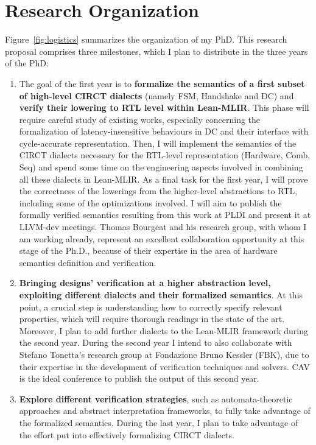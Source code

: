 \documentclass[sigconf,authorversion,nonacm, 11pt]{acmart}
\begin{document}
\section{Research Organization}

Figure~\ref{fig:logistics} summarizes the organization of my PhD.
This research proposal comprises three milestones, which I plan to distribute in the three years of the PhD: 
\begin{enumerate}
    \item The goal of the first year is to \textbf{formalize the semantics of a first subset of high-level CIRCT dialects} (namely FSM, Handshake and DC) 
 and \textbf{verify their lowering to RTL level within Lean-MLIR}.
 This phase will require careful study of existing works, especially concerning the formalization of latency-insensitive 
 behaviours in DC and their interface with cycle-accurate representation. 
 Then, I will implement the semantics of the CIRCT dialects necessary for the RTL-level representation (Hardware, Comb, Seq) and 
 spend some time on the engineering aspects involved in combining all these dialects in Lean-MLIR. 
 As a final task for the first year, I will prove the correctness of the lowerings from the higher-level 
 abstractions to RTL, including some of the optimizations involved.
 I will aim to publish the formally verified semantics resulting from this work at PLDI and present it at LLVM-dev meetings.
 Thomas Bourgeat and his research group, with whom I am working already, represent an excellent collaboration opportunity at this stage of the Ph.D., because of 
 their expertise in the area of hardware semantics definition and verification. 
    \item \textbf{Bringing designs’ verification at a higher abstraction level, exploiting different dialects and their formalized semantics}. 
 At this point, a crucial step is understanding how to correctly specify relevant properties, which will require thorough readings in the state of the art. 
 Moreover, I plan to add further dialects to the Lean-MLIR framework during the second year. 
 During the second year I intend to also collaborate with Stefano Tonetta's research group at Fondazione Bruno Kessler (FBK), due to their 
 expertise in the development of verification techniques and solvers. 
 CAV is the ideal conference to publish the output of this second year.
    \item \textbf{Explore different verification strategies}, such as automata-theoretic approaches and abstract interpretation frameworks, 
 to fully take advantage of the formalized semantics. During the last year, I plan to take advantage of the effort put into effectively formalizing CIRCT dialects. 

\end{enumerate}
\end{document}
